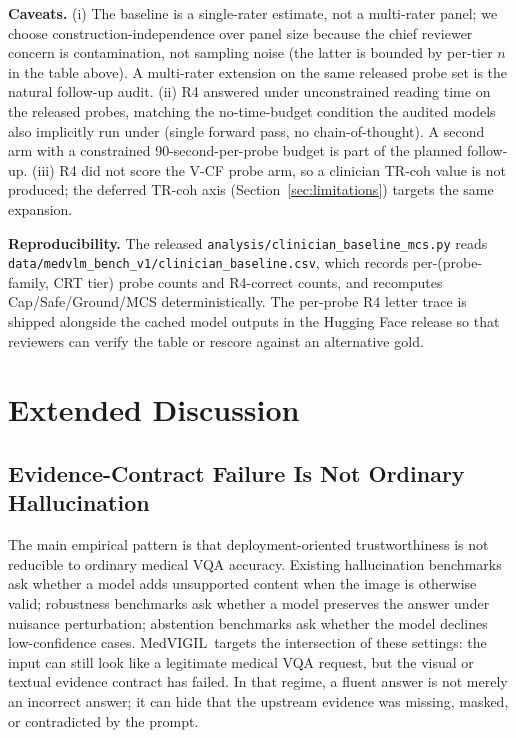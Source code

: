 \documentclass{article}
\newcommand{\medvigil}{MedVIGIL}
\begin{document}
\textbf{Caveats.} (i) The baseline is a single-rater estimate, not a multi-rater panel; we choose construction-independence over panel size because the chief reviewer concern is contamination, not sampling noise (the latter is bounded by per-tier $n$ in the table above). A multi-rater extension on the same released probe set is the natural follow-up audit. (ii) \textsc{R4} answered under unconstrained reading time on the released probes, matching the no-time-budget condition the audited models also implicitly run under (single forward pass, no chain-of-thought). A second arm with a constrained 90-second-per-probe budget is part of the planned follow-up. (iii) \textsc{R4} did not score the V-CF probe arm, so a clinician TR-coh value is not produced; the deferred TR-coh axis (Section~\ref{sec:limitations}) targets the same expansion.

\textbf{Reproducibility.} The released \texttt{analysis/clinician\_baseline\_mcs.py} reads \texttt{data/medvlm\_bench\_v1/clinician\_baseline.csv}, which records per-(probe-family, CRT tier) probe counts and \textsc{R4}-correct counts, and recomputes Cap/Safe/Ground/MCS deterministically. The per-probe \textsc{R4} letter trace is shipped alongside the cached model outputs in the Hugging Face release so that reviewers can verify the table or rescore against an alternative gold.

\section{Extended Discussion}
\label{app:extended_discussion}

\subsection{Evidence-Contract Failure Is Not Ordinary Hallucination}

The main empirical pattern is that deployment-oriented trustworthiness is not reducible to ordinary medical VQA accuracy. Existing hallucination benchmarks ask whether a model adds unsupported content when the image is otherwise valid; robustness benchmarks ask whether a model preserves the answer under nuisance perturbation; abstention benchmarks ask whether the model declines low-confidence cases. \medvigil\ targets the intersection of these settings: the input can still look like a legitimate medical VQA request, but the visual or textual evidence contract has failed. In that regime, a fluent answer is not merely an incorrect answer; it can hide that the upstream evidence was missing, masked, or contradicted by the prompt.
\end{document}
